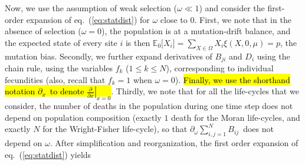 \documentclass[11pt, letterpaper]{article}
\renewcommand{\eqref}[1]{\textup{{\normalfont eq.~(\ref{#1}}\normalfont)}}
\newcommand{\deriv}[2]{\partial_{#2}\!{#1}\,}
\newcommand{\derivv}[3]{\left.\frac{\partial #1}{\partial #2}\right |_{#3=0}} %
\newcommand{\Espzero}[1]{\mathbb{E}_0\big[ #1\big]}%
\newcommand{\bigO}[1]{O\left( #1 \right)}
\begin{document}
Now, we use the assumption of weak selection ($\omega \ll 1$) and consider the first-order expansion of \eqref{eq:statdist} for $\omega$ close to $0$. First, we note that in the absence of selection ($\omega = 0$), the population is at a mutation-drift balance, and the expected state of every site $i$ is then $\Espzero{X_i} = \sum_{X\in \Omega} X_i \xi(X, 0, \mu)= p$, the mutation bias. Secondly, we further expand derivatives of $B_{ji}$ and $D_i$ using the chain rule, using the variables $f_k$ ($1\leq k \leq N$), corresponding to individual fecundities (also, recall that $f_k=1$ when $\omega=0$). \hl{Finally, we use the shorthand notation $\deriv{}{x}$ to denote $\derivv{}{x}{x}$}. Thirdly, we note that for all the life-cycles that we consider, the number of deaths in the population during one time step does not depend on population composition (exactly $1$ death for the Moran life-cycles, and exactly $N$ for the Wright-Fisher life-cycle), so that $\deriv{\sum_{i,j=1}^N B_{ij}}{\omega}$ does not depend on $\omega$. 
After simplification and reorganization, the first order expansion of \eqref{eq:statdist} yields
%
\end{document}

